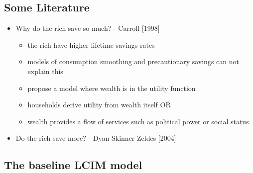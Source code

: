 \documentclass[
  letterpaper,
  DIV=11,
  numbers=noendperiod]{scrartcl}
\providecommand{\tightlist}{%
  \setlength{\itemsep}{0pt}\setlength{\parskip}{0pt}}\usepackage{longtable,booktabs,array}
\begin{document}
\[
\newcommand{\DiscFac}{\beta}
\newcommand{\cFunc}{\mathrm{c}}
\newcommand{\uFunc}{\mathrm{u}}
\newcommand{\vFunc}{\mathrm{v}}
\newcommand{\Alive}{\mathcal{L}}
\newcommand{\h}{h}
\newcommand{\cLvl}{\mathbf{c}}
\newcommand{\mLvl}{\mathbf{m}}
\newcommand{\pLvl}{\mathbf{p}}
\newcommand{\Ex}{\mathbb{E}}
\newcommand{\CRRA}{\rho}
\newcommand{\PermGroFac}{\pmb{\Phi}}
\newcommand{\Rfree}{\mathsf{R}}
\newcommand{\PermShk}{\mathbf{\Psi}}
\newcommand{\TranShk}{\pmb{\xi}}
\newcommand{\aNrm}{a}
\newcommand{\cNrm}{c}
\newcommand{\RNrm}{\mathcal{R}}
\newcommand{\TranShkEmp}{\pmb{\theta}}
\newcommand{\mNrm}{m}
\newcommand{\pZero}{\wp}
\newcommand{\aFunc}{\mathrm{a}}
\newcommand{\kapShare}{\alpha}
\newcommand{\wealth}{o}
\newcommand{\kap}{k}
\newcommand{\wealthShare}{\delta}
\newcommand{\wFunc}{\mathrm{w}}
\newcommand{\aRat}{a}
\newcommand{\mRat}{m}
\newcommand{\aMat}{[\mathrm{a}]}
\newcommand{\mMat}{[\mathrm{m}]}
\newcommand{\weight}{\omega}
\]

\subsection{Some Literature}\label{some-literature}

\begin{itemize}
\item
  Why do the rich save so much? - Carroll {[}1998{]}

  \begin{itemize}
  \tightlist
  \item
    the rich have higher lifetime savings rates
  \item
    models of consumption smoothing and precautionary savings can not
    explain this
  \item
    propose a model where wealth is in the utility function
  \item
    households derive utility from wealth itself OR
  \item
    wealth provides a flow of services such as political power or social
    status
  \end{itemize}
\item
  Do the rich save more? - Dyan Skinner Zeldes {[}2004{]}
\end{itemize}

\subsection{The baseline LCIM model}\label{the-baseline-lcim-model}
\end{document}
